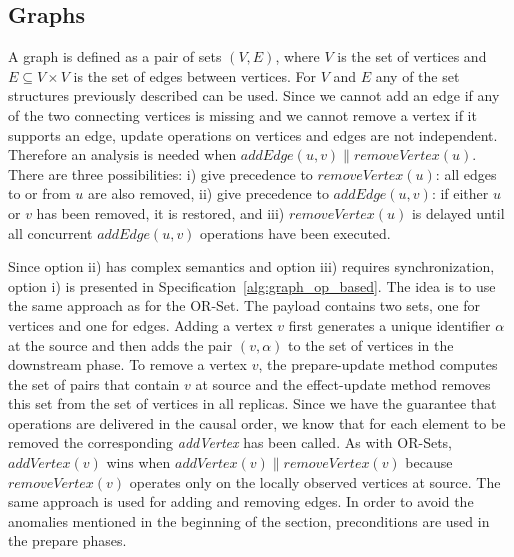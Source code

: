 \subsection{Graphs}
\label{sec:graphs}

A graph is defined as a pair of sets $(V, E)$, where $V$ is the set of vertices
and $E \subseteq V \times V$ is the set of edges between vertices. For $V$ and
$E$ any of the set structures previously described can be used. Since we cannot
add an edge if any of the two connecting vertices is missing and we cannot
remove a vertex if it supports an edge, update operations on vertices and edges
are not independent. Therefore an analysis is needed when $\textit{addEdge}(u,
v) \parallel \textit{removeVertex}(u)$. There are three possibilities: i) give
precedence to $\textit{removeVertex}(u)$: all edges to or from $u$ are also
removed, ii) give precedence to $\textit{addEdge}(u, v)$: if either $u$ or $v$
has been removed, it is restored, and iii) $\textit{removeVertex}(u)$ is delayed
until all concurrent $\textit{addEdge}(u, v)$ operations have been executed.

Since option ii) has complex semantics and option iii) requires synchronization,
option i) is presented in Specification~\ref{alg:graph_op_based}. The idea is to
use the same approach as for the OR-Set. The payload contains two sets, one for
vertices and one for edges. Adding a vertex $v$ first generates a unique
identifier $\alpha$ at the source and then adds the pair $(v, \alpha)$ to the
set of vertices in the downstream phase. To remove a vertex $v$, the
prepare-update method computes the set of pairs that contain $v$ at source and
the effect-update method removes this set from the set of vertices in all
replicas. Since we have the guarantee that operations are delivered in the
causal order, we know that for each element to be removed the corresponding
\textit{addVertex} has been called. As with OR-Sets, $\textit{addVertex}(v)$
wins when $\textit{addVertex}(v) \parallel \textit{removeVertex}(v)$ because
$\textit{removeVertex}(v)$ operates only on the locally observed vertices at
source. The same approach is used for adding and removing edges. In order to
avoid the anomalies mentioned in the beginning of the section, preconditions
are used in the prepare phases.


